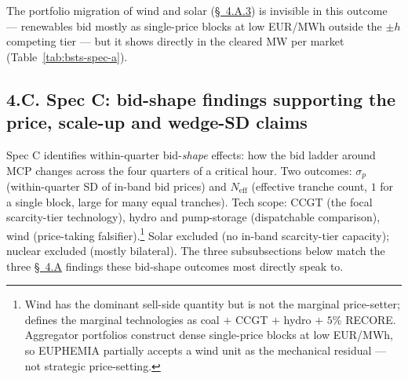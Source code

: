 \documentclass[11pt]{article}
\begin{document}
The portfolio migration of wind and solar (\hyperref[sec:4-renewable]{\S~4.A.3}) is invisible in this outcome --- renewables bid mostly as single-price blocks at low EUR/MWh outside the $\pm h$ competing tier --- but it shows directly in the cleared MW per market (Table~\ref{tab:bsts-spec-a}).

\subsection*{4.C. Spec C: bid-shape findings supporting the price, scale-up and wedge-SD claims}\label{sec:4-specC}
Spec C identifies within-quarter bid-\emph{shape} effects: how the bid ladder around MCP changes across the four quarters of a critical hour. Two outcomes: $\sigma_p$ (within-quarter SD of in-band bid prices) and $N_{\text{eff}}$ (effective tranche count, $1$ for a single block, large for many equal tranches). Tech scope: CCGT (the focal scarcity-tier technology), hydro and pump-storage (dispatchable comparison), wind (price-taking falsifier).\footnote{Wind has the dominant sell-side quantity but is not the marginal price-setter; \citet{cnmc_supervision_2025} defines the marginal technologies as coal $+$ CCGT $+$ hydro $+$ $5\%$ RECORE. Aggregator portfolios construct dense single-price blocks at low EUR/MWh, so EUPHEMIA partially accepts a wind unit as the mechanical residual --- not strategic price-setting.} Solar excluded (no in-band scarcity-tier capacity); nuclear excluded (mostly bilateral). The three subsubsections below match the three \hyperref[sec:4-specA]{\S~4.A} findings these bid-shape outcomes most directly speak to.
\end{document}
